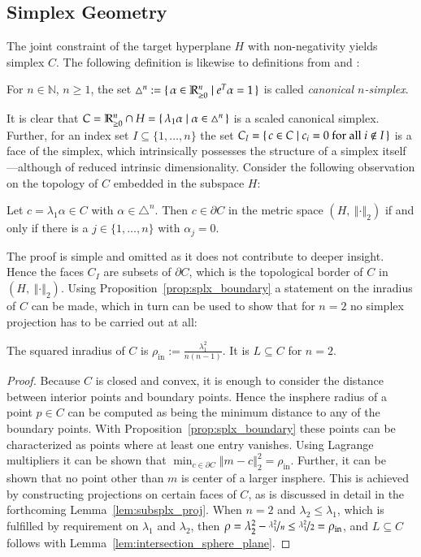 \documentclass[twoside,11pt]{article}
\DeclareMathOperator{\insphere}{in}
\newcommand{\N}{\mathbb{N}}
\newcommand{\R}{\mathbb{R}}
\newcommand{\0}{\mathcal{O}}
\newcommand{\transp}{^T}
\newcommand{\norm}[1]{\left\Vert#1\right\Vert}
\newcommand{\splx}{\triangle}
\newcommand{\discint}[2]{\{#1,\dotsc,#2\}}
\newcommand{\inint}[2]{\in\discint{#1}{#2}}
\begin{document}
\subsection{Simplex Geometry}
\label{sect:splx_geom}
The joint constraint of the target hyperplane $H$ with non-negativity yields simplex $C$.
The following definition is likewise to definitions from \citet{Chen2011} and \citet{Michelot1986}:
\begin{definition}
For $n\in\N$, $n\geq 1$, the set $\splx^n := \set{\alpha\in\R_{\geq 0}^n | e\transp\alpha = 1}$ is called \emph{canonical $n$-simplex}.
\end{definition}
It is clear that $C = \R_{\geq 0}^n\cap H = \set{\lambda_1\alpha | \alpha\in\splx^n}$ is a scaled canonical simplex.
Further, for an index set $I\subseteq\discint{1}{n}$ the set $C_I = \set{c\in C | c_i = 0\text{ for all }i\not\in I}$ is a face of the simplex, which intrinsically possesses the structure of a simplex itself---although of reduced intrinsic dimensionality.
Consider the following observation on the topology of $C$ embedded in the subspace $H$:
\begin{proposition}
\label{prop:splx_boundary}
Let $c = \lambda_1\alpha\in C$ with $\alpha\in\splx^n$.
Then $c\in\partial C$ in the metric space $\left(H,\ \norm{\cdot}_2\right)$ if and only if there is a $j\inint{1}{n}$ with $\alpha_j = 0$.
\end{proposition}
The proof is simple and omitted as it does not contribute to deeper insight.
Hence the faces $C_I$ are subsets of $\partial C$, which is the topological border of $C$ in $\left(H,\ \norm{\cdot}_2\right)$.
Using Proposition~\ref{prop:splx_boundary} a statement on the inradius of $C$ can be made, which in turn can be used to show that for $n = 2$ no simplex projection has to be carried out at all:
\begin{proposition}
\label{prop:splx_inradius}
The squared inradius of $C$ is $\rho_{\insphere} := \tfrac{\lambda_1^2}{n(n-1)}$.
It is $L\subseteq C$ for $n = 2$.
\end{proposition}
\begin{proof}
Because $C$ is closed and convex, it is enough to consider the distance between interior points and boundary points.
Hence the insphere radius of a point $p\in C$ can be computed as being the minimum distance to any of the boundary points.
With Proposition~\ref{prop:splx_boundary} these points can be characterized as points where at least one entry vanishes.
Using Lagrange multipliers it can be shown that $\min_{c\in\partial C}\norm{m - c}_2^2 = \rho_{\insphere}$.
Further, it can be shown that no point other than $m$ is center of a larger insphere.
This is achieved by constructing projections on certain faces of $C$, as is discussed in detail in the forthcoming Lemma~\ref{lem:subsplx_proj}.
When $n = 2$ and $\lambda_2 \leq \lambda_1$, which is fulfilled by requirement on $\lambda_1$ and $\lambda_2$, then $\rho = \lambda_2^2 - \nicefrac{\lambda_1^2}{n} \leq \nicefrac{\lambda_1^2}{2} = \rho_{\insphere}$, and $L\subseteq C$ follows with Lemma~\ref{lem:intersection_sphere_plane}.
\end{proof}
\end{document}
